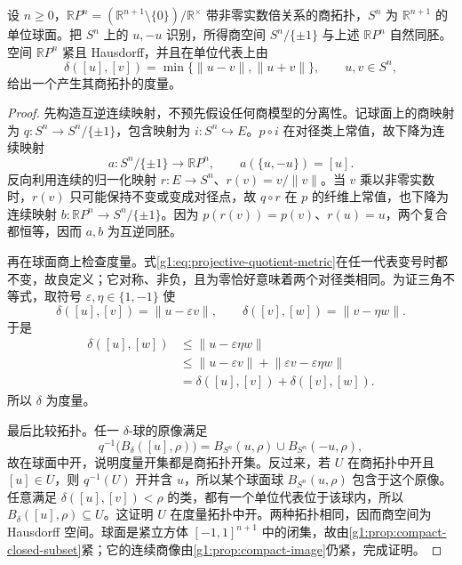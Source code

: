 \begin{theorem}\label{g1:thm:real-projective-quotient}
	设 \(n\ge0\)，\(\mathbb RP^n=(\mathbb R^{n+1}\setminus\{0\})/\mathbb R^\times\) 带非零实数倍关系的商拓扑，\(S^n\) 为 \(\mathbb R^{n+1}\) 的单位球面。把 \(S^n\) 上的 \(u,-u\) 识别，所得商空间 \(S^n/\{\pm1\}\) 与上述 \(\mathbb RP^n\) 自然同胚。空间 \(\mathbb RP^n\) 紧且 Hausdorff，并且在单位代表上由
	\begin{equation}\label{g1:eq:projective-quotient-metric}
		\delta([u],[v])=\min\{\lVert u-v\rVert,\lVert u+v\rVert\},\qquad u,v\in S^n,
	\end{equation}
	给出一个产生其商拓扑的度量。
\end{theorem}
\begin{proof}
	先构造互逆连续映射，不预先假设任何商模型的分离性。记球面上的商映射为 \(q:S^n\to S^n/\{\pm1\}\)，包含映射为 \(i:S^n\hookrightarrow E\)。\(p\circ i\) 在对径类上常值，故下降为连续映射
	\[
		a:S^n/\{\pm1\}\longrightarrow\mathbb RP^n,\qquad a(\{u,-u\})=[u].
	\]
	反向利用连续的归一化映射 \(r:E\to S^n\)、\(r(v)=v/\lVert v\rVert\)。当 \(v\) 乘以非零实数时，\(r(v)\) 只可能保持不变或变成对径点，故 \(q\circ r\) 在 \(p\) 的纤维上常值，也下降为连续映射 \(b:\mathbb RP^n\to S^n/\{\pm1\}\)。因为 \(p(r(v))=p(v)\)、\(r(u)=u\)，两个复合都恒等，因而 \(a,b\) 为互逆同胚。

	再在球面商上检查度量。式\eqref{g1:eq:projective-quotient-metric}在任一代表变号时都不变，故良定义；它对称、非负，且为零恰好意味着两个对径类相同。为证三角不等式，取符号 \(\varepsilon,\eta\in\{1,-1\}\) 使
	\[
		\delta([u],[v])=\lVert u-\varepsilon v\rVert,\qquad
		\delta([v],[w])=\lVert v-\eta w\rVert.
	\]
	于是
	\[
		\begin{aligned}
			\delta([u],[w])&\le\lVert u-\varepsilon\eta w\rVert\\
			&\le\lVert u-\varepsilon v\rVert+\lVert\varepsilon v-\varepsilon\eta w\rVert\\
			&=\delta([u],[v])+\delta([v],[w]).
		\end{aligned}
	\]
	所以 \(\delta\) 为度量。

	最后比较拓扑。任一 \(\delta\)-球的原像满足
	\[
		q^{-1}\bigl(B_\delta([u],\rho)\bigr)
		=B_{S^n}(u,\rho)\cup B_{S^n}(-u,\rho),
	\]
	故在球面中开，说明度量开集都是商拓扑开集。反过来，若 \(U\) 在商拓扑中开且 \([u]\in U\)，则 \(q^{-1}(U)\) 开并含 \(u\)，所以某个球面球 \(B_{S^n}(u,\rho)\) 包含于这个原像。任意满足 \(\delta([u],[v])<\rho\) 的类，都有一个单位代表位于该球内，所以 \(B_\delta([u],\rho)\subseteq U\)。这证明 \(U\) 在度量拓扑中开。两种拓扑相同，因而商空间为 Hausdorff 空间。球面是紧立方体 \([-1,1]^{n+1}\) 中的闭集，故由\cref{g1:prop:compact-closed-subset}紧；它的连续商像由\cref{g1:prop:compact-image}仍紧，完成证明。
\end{proof}

